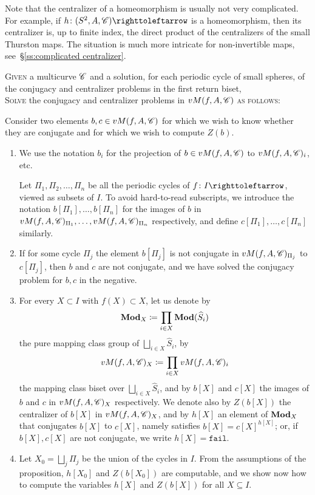 \documentclass{amsart}
\begin{document}
Note that the centralizer of a homeomorphism is usually not very
complicated. For example, if $h\colon(S^2,A,\CC)\selfmap$ is a
homeomorphism, then its centralizer is, up to finite index, the direct
product of the centralizers of the small Thurston maps. The situation
is much more intricate for non-invertible maps,
see~\S\ref{ss:complicated centralizer}.

\begin{algo}\label{algo:smalltobig}
  \textsc{Given} a multicurve ${\mathscr C}$ and a solution, for each periodic
  cycle of small spheres, of the conjugacy and centralizer problems in
  the first return biset,\\
  \textsc{Solve} the conjugacy and centralizer problems in $vM(f,A,{\mathscr C})$
  \textsc{as follows:}\upshape

  Consider two elements $b,c\in vM(f,A,{\mathscr C})$ for which we wish to know
  whether they are conjugate and for which we wish to compute $Z(b)$.
  \begin{enumerate}
  \item We use the notation $b_i$ for the projection of
    $b\in vM(f,A,{\mathscr C})$ to $vM(f,A,{\mathscr C})_i$, etc.

    Let $\Pi_1,\Pi_2,\dots,\Pi_n$ be all the periodic cycles of
    $f\colon I\selfmap$, viewed as subsets of $I$. To avoid
    hard-to-read subscripts, we introduce the notation
    $b[\Pi_1],\dots,b[\Pi_n]$ for the images of $b$ in
    $vM(f,A,{\mathscr C})_{\Pi_1},\dots,vM(f,A,{\mathscr C})_{\Pi_n}$ respectively, and
    define $c[\Pi_1],\dots,c[\Pi_n]$ similarly.
  \item If for some cycle $\Pi_j$ the element $b[\Pi_j]$ is not
    conjugate in $vM(f,A,{\mathscr C})_{\Pi_j}$ to $c[\Pi_j]$, then $b$ and $c$
    are not conjugate, and we have solved the conjugacy problem for
    $b,c$ in the negative.
  \item For every $X\subset I$ with $f(X)\subset X$, let us denote by
    \[\mathbf{\relax Mod}_X\coloneqq\prod_{i\in X}\mathbf{\relax Mod}(\widehat S_i)
    \]
    the pure mapping class group of $\bigsqcup_{i\in X}\widehat S_i$, by
    \[vM(f,A,{\mathscr C})_X\coloneqq\prod_{i\in X}vM(f,A,{\mathscr C})_i
    \]
    the mapping class biset over $\bigsqcup_{i\in X}\widehat S_i$, and by
    $b[X]$ and $c[X]$ the images of $b$ and $c$ in $vM(f,A,{\mathscr C})_X$
    respectively. We denote also by $Z(b[X])$ the centralizer of
    $b[X]$ in $vM(f,A,{\mathscr C})_X$, and by $h[X]$ an element of $\mathbf{\relax Mod}_X$
    that conjugates $b[X]$ to $c[X]$, namely satisfies
    $b[X]=c[X]^{h[X]}$; or, if $b[X],c[X]$ are not conjugate, we write
    $h[X]=\texttt{fail}$.
  \item Let $X_0=\bigsqcup_j\Pi_j$ be the union of the cycles in $I$.
    From the assumptions of the proposition, $h[X_0]$ and $Z(b[X_0])$
    are computable, and we show now how to compute the variables
    $h[X]$ and $Z(b[X])$ for all $X\subseteq I$.


\end{enumerate}
\end{algo}
\end{document}

